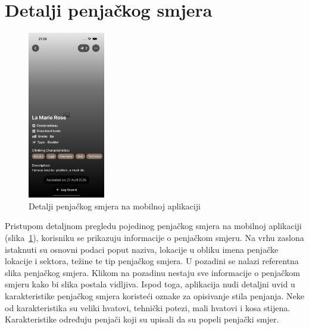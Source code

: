 \section{Detalji penjačkog smjera}

\begin{figure}[H]
    \centering
    \includegraphics[width=0.3\textwidth]{images/implementacija/route-details/route-details.png}
    \caption{Detalji penjačkog smjera na mobilnoj aplikaciji}
    \label{fig:detalji_smjera}
\end{figure}

Pristupom detaljnom pregledu pojedinog penjačkog smjera na mobilnoj aplikaciji (slika~\ref{fig:detalji_smjera}), korisniku se prikazuju informacije o penjačkom smjeru. Na vrhu zaslona istaknuti su osnovni podaci poput naziva, lokacije u obliku imena penjačke lokacije i sektora, težine te tip penjačkog smjera. 
U pozadini se nalazi referentna slika penjačkog smjera. Klikom na pozadinu nestaju sve informacije o penjačkom smjeru kako bi slika postala vidljiva. Ispod toga, aplikacija nudi detaljni uvid u karakteristike penjačkog smjera koristeći oznake za opisivanje stila penjanja. Neke od karakteristika su veliki hvatovi, tehnički potezi, mali hvatovi i kosa stijena. Karakteristike određuju penjači koji su upisali da su popeli penjački smjer.

